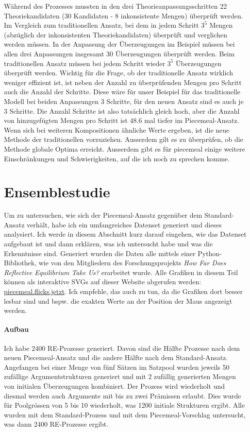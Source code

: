 \documentclass{article}
\begin{document}
 Während des Prozesses mussten in den drei Theorieanpassungsschritten 22 Theoriekandidaten (30 Kandidaten - 8 inkonsistente Mengen) überprüft werden.  Im Vergleich zum traditionellen Ansatz, bei dem in jedem Schritt $3^5$ Mengen (abzüglich der inkonsistenten Theoriekandidaten) überprüft und verglichen werden müssen. In der Anpassung der Überzeugungen im Beispiel müssen bei allen drei Anpassungen insgesamt 30 Überzeugungen überprüft werden. Beim traditionellen Ansatz müssen bei jedem Schritt wieder $3^5$ Überzeugungen überprüft werden. Wichtig für die Frage, ob der traditionelle Ansatz wirklich weniger effizient ist, ist neben der Anzahl zu überprüfenden Mengen pro Schritt auch die Anzahl der Schritte. Diese wäre für unser Beispiel für das traditionelle Modell bei beiden Anpassungen 3 Schritte, für den neuen Ansatz sind es auch je 3 Schritte. Die Anzahl Schritte ist also tatsächlich gleich hoch, aber die Anzahl von hinzugefügten Mengen pro Schritt ist $48.6$ mal tiefer im Piecemeal-Ansatz. Wenn sich bei weiteren Kompositionen ähnliche Werte ergeben, ist die neue Methode der traditionellen vorzuziehen. Ausserdem gilt es zu überprüfen, ob die Methode globale Optima erreicht. Ausserdem gibt es für piecemeal einige weitere Einschränkungen und Schwierigkeiten, auf die ich noch zu sprechen komme.

\section{Ensemblestudie} \label{Ensemblestudie}

Um zu untersuchen, wie sich der Piecemeal-Ansatz gegenüber dem Standard-Ansatz verhält, habe ich ein umfangreiches Datenset generiert und dieses analysiert. Ich werde in diesem Abschnitt kurz darauf eingehen, wie das Datenset aufgebaut ist und dann erklären, was ich untersucht habe und was die Erkenntnisse sind. Generiert wurden die Daten alle mittels einer Python-Bibliothek, wie von den Mitgliedern des Forschungsprojekts \textit{How Far Does Reflective Equilibrium Take Us?} erarbeitet wurde. Alle Grafiken in diesem Teil können als interaktive SVGs auf dieser Website abgerufen werden: \href{https://piecemeal.flicks.jetzt/}{piecemeal.flicks.jetzt}. Ich empfehle, das auch zu tun, da die Grafiken dort besser lesbar sind und bspw. die exakten Werte an der Position der Maus angezeigt werden.

\paragraph{Aufbau} Ich habe 2400 RE-Prozesse generiert. Davon sind die Hälfte Prozesse nach dem neuen Piecemeal-Ansatz und die andere Hälfte nach dem Standard-Ansatz. Angefangen bei einer Menge von fünf Sätzen im Satzpool wurden jeweils 50 zufällige Argumentstrukturen generiert und mit 2 zufällig generierten Mengen von initialen Überzeugungen kombiniert. Der Prozess wird wiederholt und diesmal werden auch Argumente mit bis zu zwei Prämissen erlaubt. Dies wurde für Poolgrössen von 5 bis 10 wiederholt, was 1200 initiale Strukturen ergibt. Alle wurden mit dem Standard-Prozess und mit dem Piecemeal-Vorschlag untersucht, was dann 2400 RE-Prozesse ergibt.
\end{document}
